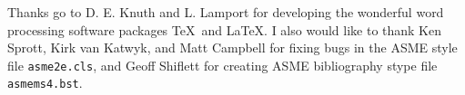 \documentclass[twocolumn,10pt]{asme2e}
\begin{document}






\begin{acknowledgment}
Thanks go to D. E. Knuth and L. Lamport for developing the wonderful word processing software packages \TeX\ and \LaTeX. I also would like to thank Ken Sprott, Kirk van Katwyk, and Matt Campbell for fixing bugs in the ASME style file \verb+asme2e.cls+, and Geoff Shiflett for creating 
ASME bibliography stype file \verb+asmems4.bst+.
\end{acknowledgment}
\end{document}
